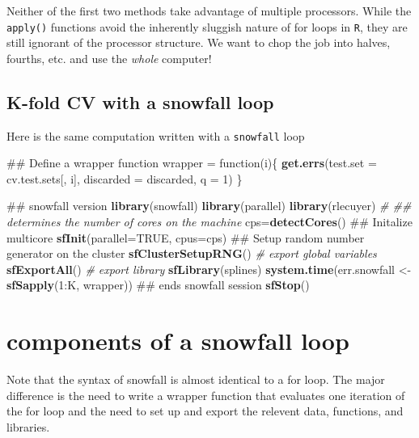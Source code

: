 \documentclass[]{article}
\newenvironment{Shaded}{\begin{snugshade}}{\end{snugshade}}
\newcommand{\KeywordTok}[1]{\textcolor[rgb]{0.13,0.29,0.53}{\textbf{{#1}}}}
\newcommand{\DataTypeTok}[1]{\textcolor[rgb]{0.13,0.29,0.53}{{#1}}}
\newcommand{\DecValTok}[1]{\textcolor[rgb]{0.00,0.00,0.81}{{#1}}}
\newcommand{\StringTok}[1]{\textcolor[rgb]{0.31,0.60,0.02}{{#1}}}
\newcommand{\CommentTok}[1]{\textcolor[rgb]{0.56,0.35,0.01}{\textit{{#1}}}}
\newcommand{\OtherTok}[1]{\textcolor[rgb]{0.56,0.35,0.01}{{#1}}}
\newcommand{\NormalTok}[1]{{#1}}
\begin{document}
Neither of the first two methods take advantage of multiple processors.
While the \texttt{apply()} functions avoid the inherently sluggish
nature of for loops in \texttt{R}, they are still ignorant of the
processor structure. We want to chop the job into halves, fourths, etc.
and use the \emph{whole} computer!

\subsection{K-fold CV with a snowfall
loop}\label{k-fold-cv-with-a-snowfall-loop}

Here is the same computation written with a \texttt{snowfall} loop

\begin{Shaded}
\begin{Highlighting}[]
\NormalTok{## Define a wrapper function}
\NormalTok{wrapper =}\StringTok{ }\NormalTok{function(i)\{}
  \KeywordTok{get.errs}\NormalTok{(}\DataTypeTok{test.set =} \NormalTok{cv.test.sets[, i], }\DataTypeTok{discarded =} \NormalTok{discarded, }\DataTypeTok{q =} \DecValTok{1}\NormalTok{)}
\NormalTok{\}}

\NormalTok{## snowfall version}
\KeywordTok{library}\NormalTok{(snowfall)}
\KeywordTok{library}\NormalTok{(parallel)}
\KeywordTok{library}\NormalTok{(rlecuyer)}
\CommentTok{# ## determines the number of cores on the machine}
\NormalTok{cps=}\KeywordTok{detectCores}\NormalTok{()}
\NormalTok{## Initalize multicore }
\KeywordTok{sfInit}\NormalTok{(}\DataTypeTok{parallel=}\OtherTok{TRUE}\NormalTok{, }\DataTypeTok{cpus=}\NormalTok{cps)}
\NormalTok{## Setup random number generator on the cluster}
\KeywordTok{sfClusterSetupRNG}\NormalTok{()}
\CommentTok{# export global variables}
\KeywordTok{sfExportAll}\NormalTok{()}
\CommentTok{# export library}
\KeywordTok{sfLibrary}\NormalTok{(splines)}
\KeywordTok{system.time}\NormalTok{(err.snowfall <-}\StringTok{ }\KeywordTok{sfSapply}\NormalTok{(}\DecValTok{1}\NormalTok{:K, wrapper))}
\NormalTok{## ends snowfall session}
\KeywordTok{sfStop}\NormalTok{()}
\end{Highlighting}
\end{Shaded}

\section{components of a snowfall
loop}\label{components-of-a-snowfall-loop}

Note that the syntax of snowfall is almost identical to a for loop. The
major difference is the need to write a wrapper function that evaluates
one iteration of the for loop and the need to set up and export the
relevent data, functions, and libraries.
\end{document}
